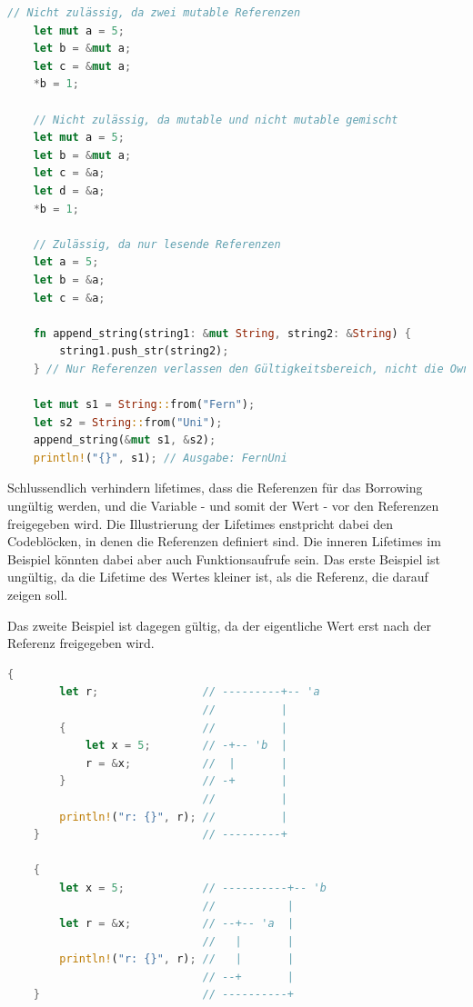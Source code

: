 \documentclass[11pt,a4paper, ngerman]{article}
\begin{document}
\begin{lstlisting}[language=rust, caption={borrowing}]
    // Nicht zulässig, da zwei mutable Referenzen
    let mut a = 5;
    let b = &mut a;
    let c = &mut a;
    *b = 1;

    // Nicht zulässig, da mutable und nicht mutable gemischt
    let mut a = 5;
    let b = &mut a;
    let c = &a;
    let d = &a;
    *b = 1;

    // Zulässig, da nur lesende Referenzen
    let a = 5;
    let b = &a;
    let c = &a;

    fn append_string(string1: &mut String, string2: &String) {
        string1.push_str(string2);
    } // Nur Referenzen verlassen den Gültigkeitsbereich, nicht die Owner!

    let mut s1 = String::from("Fern");
    let s2 = String::from("Uni");
    append_string(&mut s1, &s2);
    println!("{}", s1); // Ausgabe: FernUni
\end{lstlisting}

Schlussendlich verhindern lifetimes, dass die Referenzen für das Borrowing ungültig werden, und die Variable - und somit der Wert - vor den Referenzen freigegeben wird. Die Illustrierung der Lifetimes enstpricht dabei den Codeblöcken, in denen die Referenzen definiert sind. Die inneren Lifetimes im Beispiel könnten dabei aber auch Funktionsaufrufe sein. Das erste Beispiel ist ungültig, da die Lifetime des Wertes kleiner ist, als die Referenz, die darauf zeigen soll.

Das zweite Beispiel ist dagegen gültig, da der eigentliche Wert erst nach der Referenz freigegeben wird.

\begin{lstlisting}[language=rust, caption={lifetime Veranschaulichung \cite{LifetimeEx}}]
    {
        let r;                // ---------+-- 'a
                              //          |
        {                     //          |
            let x = 5;        // -+-- 'b  |
            r = &x;           //  |       |
        }                     // -+       |
                              //          |
        println!("r: {}", r); //          |
    }                         // ---------+

    {
        let x = 5;            // ----------+-- 'b
                              //           |
        let r = &x;           // --+-- 'a  |
                              //   |       |
        println!("r: {}", r); //   |       |
                              // --+       |
    }                         // ----------+
\end{lstlisting}
\end{document}
